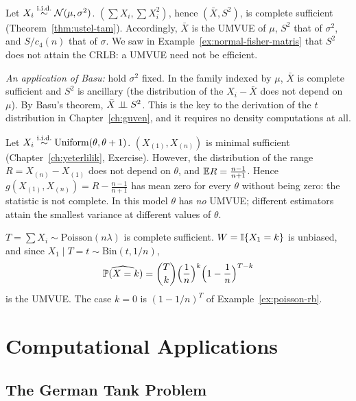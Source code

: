 \documentclass[main.tex]{subfiles}
\begin{document}
\begin{example}\label{ex:normal-basu}
Let $X_i\iid\Normal(\mu,\sigma^2)$. $(\sum X_i,\sum X_i^2)$, hence $(\bar X,S^2)$, is complete sufficient (Theorem~\ref{thm:ustel-tam}). Accordingly, $\bar X$ is the UMVUE of $\mu$, $S^2$ that of $\sigma^2$, and $S/c_4(n)$ that of $\sigma$. We saw in Example~\ref{ex:normal-fisher-matris} that $S^2$ does not attain the CRLB: a UMVUE need not be efficient.

\emph{An application of Basu:} hold $\sigma^2$ fixed. In the family indexed by $\mu$, $\bar X$ is complete sufficient and $S^2$ is ancillary (the distribution of the $X_i-\bar X$ does not depend on $\mu$). By Basu's theorem, $\bar X\indep S^2$. This is the key to the derivation of the $t$ distribution in Chapter~\ref{ch:guven}, and it requires no density computations at all.
\end{example}

\begin{example}\label{ex:tam-degil}
Let $X_i\iid\text{Uniform}(\theta,\theta+1)$. $(X_{(1)},X_{(n)})$ is minimal sufficient (Chapter~\ref{ch:yeterlilik}, Exercise). However, the distribution of the range $R=X_{(n)}-X_{(1)}$ does not depend on $\theta$, and $\E R=\frac{n-1}{n+1}$. Hence $g(X_{(1)},X_{(n)})=R-\frac{n-1}{n+1}$ has mean zero for every $\theta$ without being zero: the statistic is not complete. In this model $\theta$ has \emph{no} UMVUE; different estimators attain the smallest variance at different values of $\theta$.
\end{example}

\begin{example}[Poisson: the UMVUE of $\P(X=k)$]
$T=\sum X_i\sim\text{Poisson}(n\lambda)$ is complete sufficient. $W=\I\{X_1=k\}$ is unbiased, and since $X_1\mid T=t\sim\text{Bin}(t,1/n)$,
\[
\widehat{\P(X=k)}=\binom Tk\Big(\frac1n\Big)^k\Big(1-\frac1n\Big)^{T-k}
\]
is the UMVUE. The case $k=0$ is $(1-1/n)^T$ of Example~\ref{ex:poisson-rb}.
\end{example}

\section{Computational Applications}

\subsection{The German Tank Problem}
\end{document}
